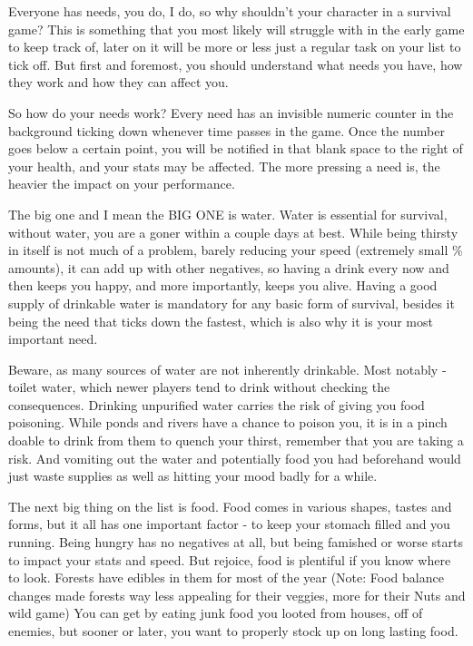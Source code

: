 Everyone has needs, you do, I do, so why shouldn't your character in a survival game? This is something that you most likely will struggle with in the early game to keep track of, later on it will be more or less just a regular task on your list to tick off. But first and foremost, you should understand what needs you have, how they work and how they can affect you.

So how do your needs work? Every need has an invisible numeric counter in the background ticking down whenever time passes in the game. Once the number goes below a certain point, you will be notified in that blank space to the right of your health, and your stats may be affected. The more pressing a need is, the heavier the impact on your performance.

The big one and I mean the BIG ONE is water. Water is essential for survival, without water, you are a goner within a couple days at best. While being thirsty in itself is not much of a problem, barely reducing your speed (extremely small \% amounts), it can add up with other negatives, so having a drink every now and then keeps you happy, and more importantly, keeps you alive. Having a good supply of drinkable water is mandatory for any basic form of survival, besides it being the need that ticks down the fastest, which is also why it is your most important need.

Beware, as many sources of water are not inherently drinkable. Most notably - toilet water, which newer players tend to drink without checking the consequences. Drinking unpurified water carries the risk of giving you food poisoning. While ponds and rivers have a chance to poison you, it is in a pinch doable to drink from them to quench your thirst, remember that you are taking a risk. And vomiting out the water and potentially food you had beforehand would just waste supplies as well as hitting your mood badly for a while.

The next big thing on the list is food. Food comes in various shapes, tastes and forms, but it all has one important factor - to keep your stomach filled and you running. Being hungry has no negatives at all, but being famished or worse starts to impact your stats and speed. But rejoice, food is plentiful if you know where to look. Forests have edibles in them for most of the year (Note: Food balance changes made forests way less appealing for their veggies, more for their Nuts and wild game) You can get by eating junk food you looted from houses, off of enemies, but sooner or later, you want to properly stock up on long lasting food.

